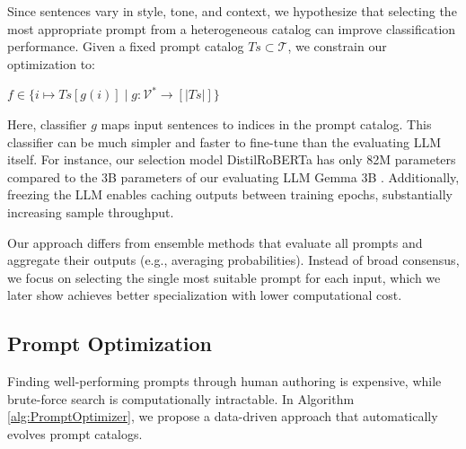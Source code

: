 \documentclass{article}
\theoremstyle{plain}
\theoremstyle{definition}
\theoremstyle{remark}
\begin{document}
Since sentences vary in style, tone, and context, we hypothesize that selecting the most appropriate prompt from a heterogeneous catalog can improve classification performance. Given a fixed prompt catalog $\textit{Ts} \subset \mathcal{T}$, we constrain our optimization to:

\begin{center}
    $f \in \{ i \mapsto \textit{Ts}[g(i)] \mid g: \mathcal V^\ast \to [|\textit{Ts}|] \}$
\end{center}

Here, classifier $g$ maps input sentences to indices in the prompt catalog. This classifier can be much simpler and faster to fine-tune than the evaluating LLM itself. For instance, our selection model DistilRoBERTa \cite{distilRoBERTa} has only 82M parameters compared to the 3B parameters of our evaluating LLM Gemma 3B \cite{gemma_2025}. Additionally, freezing the LLM enables caching outputs between training epochs, substantially increasing sample throughput.

Our approach differs from ensemble methods \cite{ensemble} that evaluate all prompts and aggregate their outputs (e.g., averaging probabilities). Instead of broad consensus, we focus on selecting the single most suitable prompt for each input, which we later show achieves better specialization with lower computational cost.

\subsection{Prompt Optimization}
\label{sec:promptOptimization}

Finding well-performing prompts through human authoring is expensive, while brute-force search is computationally intractable. In Algorithm \ref{alg:PromptOptimizer}, we propose a data-driven approach that automatically evolves prompt catalogs.
\end{document}
